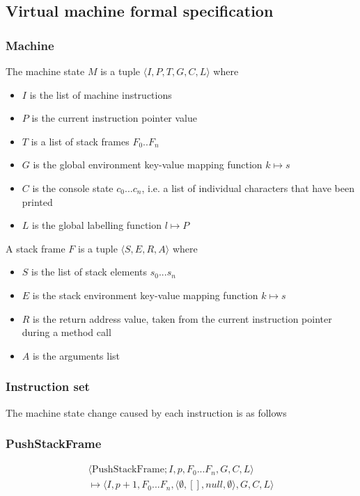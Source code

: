 \subsection{Virtual machine formal specification}

\subsubsection{Machine}

The machine state $M$ is a tuple $\langle I, P, T, G, C, L \rangle$ where
\begin{itemize}
\item $I$ is the list of machine instructions
\item $P$ is the current instruction pointer value
\item $T$ is a list of stack frames $F_0..F_n$
\item $G$ is the global environment key-value mapping function $k \mapsto s$
\item $C$ is the console state $c_0...c_n$, i.e. a list of individual characters that have been printed
\item $L$ is the global labelling function $l \mapsto P$
\end{itemize}

A stack frame $F$ is a tuple $\langle S, E, R, A \rangle$ where
\begin{itemize}
\item $S$ is the list of stack elements $s_0...s_n$
\item $E$ is the stack environment key-value mapping function $k \mapsto s$
\item $R$ is the return address value, taken from the current instruction pointer during a method call
\item $A$ is the arguments list
\end{itemize}

\subsubsection{Instruction set}

The machine state change caused by each instruction is as follows

\subsubsection{PushStackFrame}

\begin{multline*}
\langle \text{PushStackFrame}; I, p, F_0...F_n, G, C, L\rangle  \\ \mapsto \langle I, p+1, F_0...F_n, \langle \emptyset, [], null, \emptyset\rangle , G, C, L\rangle 
\end{multline*}

